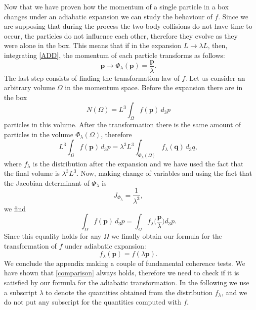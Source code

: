 \documentclass[useAMS,usenatbib,prd,twocolumn,nofootinbib]{revtex4-1}
\newcommand{\vect}[1]{\mathbf{{#1}}}
\begin{document}
Now that we have proven how the momentum of a single particle in a box changes under an adiabatic expansion we can study the behaviour of $f$. Since we are supposing that during the process the two-body collisions do not have time to occur, the particles do not influence each other, therefore they evolve as they were alone in the box. This means that if in the expansion $L \longrightarrow \lambda L$, then, integrating \eqref{ADD}, the momentum of each particle transforms as follows:
\begin{equation}
\vect{p} \longrightarrow \Phi_\lambda(\vect{p}) = \dfrac{\vect{p}}{\lambda} .
\end{equation}
The last step consists of finding the transformation law of $f$. Let us consider an arbitrary volume $\Omega$ in the momentum space. Before the expansion there are in the box 
\begin{equation}
N(\Omega) =L^3 \int_\Omega f(\vect{p}) \, d_3 p
\end{equation}
particles in this volume. After the transformation there is the same amount of particles in the volume $\Phi_\lambda(\Omega)$, therefore
\begin{equation}
L^3 \int_\Omega f(\vect{p}) \, d_3 p = \lambda^3 L^3 \int_{\Phi_\lambda(\Omega)} f_\lambda (\vect{q}) \, d_3 q ,
\end{equation}
where $f_\lambda$ is the distribution after the expansion and we have used the fact that the final volume is $\lambda^3 L^3$. Now, making change of variables and using the fact that the Jacobian determinant of $\Phi_\lambda$ is
\begin{equation}
J_{\Phi_\lambda} = \dfrac{1}{\lambda^3} ,
\end{equation}
we find
\begin{equation}
 \int_\Omega f(\vect{p}) \, d_3 p =   \int_{\Omega} f_\lambda \bigg( \dfrac{\vect{p}}{\lambda} \bigg) d_3 p .
\end{equation}
Since this equality holds for any $\Omega$ we finally obtain our formula for the transformation of $f$ under adiabatic expansion:
\begin{equation}\label{transformation}
f_\lambda (\vect{p}) = f(\lambda \vect{p}).
\end{equation}
We conclude the appendix making a couple of fundamental coherence tests. We have shown that \eqref{comparison} always holds, therefore we need to check if it is satisfied by our formula for the adiabatic transformation. In the following we use a subscript $\lambda$ to denote the quantities obtained from the distribution $f_\lambda$, and we do not put any subscript for the quantities computed with $f$.
\end{document}
